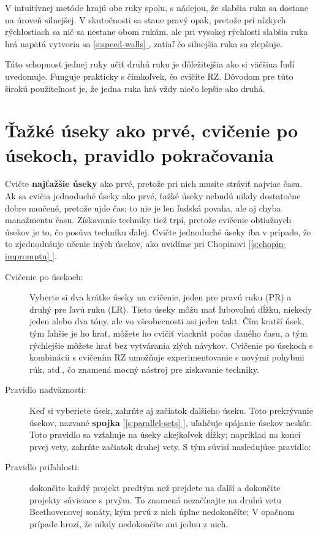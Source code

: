 \documentclass[11pt,a4paper]{book}
\newcommand*{\fullref}[1]{\hyperref[{#1}]{\ref*{#1} \nameref*{#1}}} %
\newcommand*{\fullrefp}[1]{[\fullref{#1}]} %
\begin{document}
V intuitívnej metóde hrajú obe ruky spolu, s nádejou, že slabšia ruka sa dostane na úroveň silnejšej. V skutočnosti sa stane pravý opak, pretože pri nízkych rýchlostiach sa nič sa nestane obom rukám, ale pri vysokej rýchlosti slabšia ruka hrá napätá vytvoria sa \fullref{s:speed-walls}, zatiaľ čo silnejšia ruka sa zlepšuje.

Táto schopnosť jednej ruky učiť druhú ruku je dôležitejšia ako si väčšina ľudí uvedomuje. Funguje prakticky s čímkoľvek, čo cvičíte RZ. Dôvodom pre túto širokú použiteľnosť je, že jedna ruka hrá vždy niečo lepšie ako druhá. 

\section{Ťažké úseky ako prvé, cvičenie po úsekoch, pravidlo pokračovania}\label{s:difficult-sections}
Cvičte \textbf{najťažšie úseky} ako prvé, pretože pri nich musíte stráviť najviac času. Ak sa cvičia jednoduché úseky ako prvé, ťažké úseky nebudú nikdy dostatočne dobre naučené, pretože ujde čas; to nie je len ľudská povaha, ale aj chyba manažmentu času. Získavanie techniky tiež trpí, pretože cvičenie obtiažnych úsekov je to, čo posúva techniku ďalej. Cvičte jednoduché úseky iba v prípade, že to zjednodušuje učenie iných úsekov, ako uvidíme pri Chopinovi \fullrefp{s:chopin-impromptu}.

\begin{description}
\item[Cvičenie po úsekoch:] Vyberte si dva krátke úseky na cvičenie, jeden pre pravú ruku (PR) a druhý pre ľavú ruku (ĽR). Tieto úseky môžu mať ľubovoľnú dĺžku, niekedy jeden alebo dva tóny, ale vo všeobecnosti asi jeden takt. Čím kratší úsek, tým ľahšie je ho hrať, môžete ho cvičiť viackrát počas daného času, a tým rýchlejšie môžete hrať bez vytvárania zlých návykov. Cvičenie po úsekoch s kombinácii s cvičením RZ umožňuje experimentovanie s novými pohybmi rúk, atď., čo znamená mocný nástroj pre získavanie techniky.

\item[Pravidlo nadväznosti:] Keď si vyberiete úsek, zahrňte aj začiatok ďalšieho úseku. Toto prekrývanie úsekov, nazvané \textbf{spojka} \fullrefp{s:parallel-sets}, uľahčuje spájanie úsekov neskôr. Toto pravidlo sa vzťahuje na úseky akejkoľvek dĺžky; napríklad na konci prvej vety, zahrňte začiatok druhej vety. S tým súvisí nasledujúce pravidlo:

\item[Pravidlo priľahlosti:] dokončite každý projekt predtým než prejdete na ďalší a dokončite projekty súvisiace s prvým. To znamená nezačínajte na druhú vetu Beethovenovej sonáty, kým prvú z nich úplne nedokončíte; V opačnom prípade hrozí, že nikdy nedokončíte ani jednu z nich.
\end{description}
\end{document}

